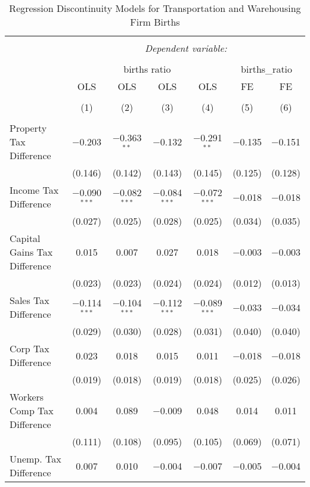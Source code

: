 
\begin{table}[!htbp] \centering 
  \caption{Regression Discontinuity Models for  Transportation and Warehousing Firm Births} 
  \label{48-49rd} 
\begin{tabular}{@{\extracolsep{5pt}}lcccccc} 
\\[-1.8ex]\hline 
\hline \\[-1.8ex] 
 & \multicolumn{6}{c}{\textit{Dependent variable:}} \\ 
\cline{2-7} 
\\[-1.8ex] & \multicolumn{4}{c}{births ratio} & \multicolumn{2}{c}{births\_ratio} \\ 
 & OLS & OLS & OLS & OLS & FE & FE \\ 
\\[-1.8ex] & (1) & (2) & (3) & (4) & (5) & (6)\\ 
\hline \\[-1.8ex] 
 Property Tax Difference & $-$0.203 & $-$0.363$^{**}$ & $-$0.132 & $-$0.291$^{**}$ & $-$0.135 & $-$0.151 \\ 
  & (0.146) & (0.142) & (0.143) & (0.145) & (0.125) & (0.128) \\ 
  Income Tax Difference & $-$0.090$^{***}$ & $-$0.082$^{***}$ & $-$0.084$^{***}$ & $-$0.072$^{***}$ & $-$0.018 & $-$0.018 \\ 
  & (0.027) & (0.025) & (0.028) & (0.025) & (0.034) & (0.035) \\ 
  Capital Gains Tax Difference & 0.015 & 0.007 & 0.027 & 0.018 & $-$0.003 & $-$0.003 \\ 
  & (0.023) & (0.023) & (0.024) & (0.024) & (0.012) & (0.013) \\ 
  Sales Tax Difference & $-$0.114$^{***}$ & $-$0.104$^{***}$ & $-$0.112$^{***}$ & $-$0.089$^{***}$ & $-$0.033 & $-$0.034 \\ 
  & (0.029) & (0.030) & (0.028) & (0.031) & (0.040) & (0.040) \\ 
  Corp Tax Difference & 0.023 & 0.018 & 0.015 & 0.011 & $-$0.018 & $-$0.018 \\ 
  & (0.019) & (0.018) & (0.019) & (0.018) & (0.025) & (0.026) \\ 
  Workers Comp Tax Difference & 0.004 & 0.089 & $-$0.009 & 0.048 & 0.014 & 0.011 \\ 
  & (0.111) & (0.108) & (0.095) & (0.105) & (0.069) & (0.071) \\ 
  Unemp. Tax Difference & 0.007 & 0.010 & $-$0.004 & $-$0.007 & $-$0.005 & $-$0.004 \\ 

\end{tabular}
\end{table}
